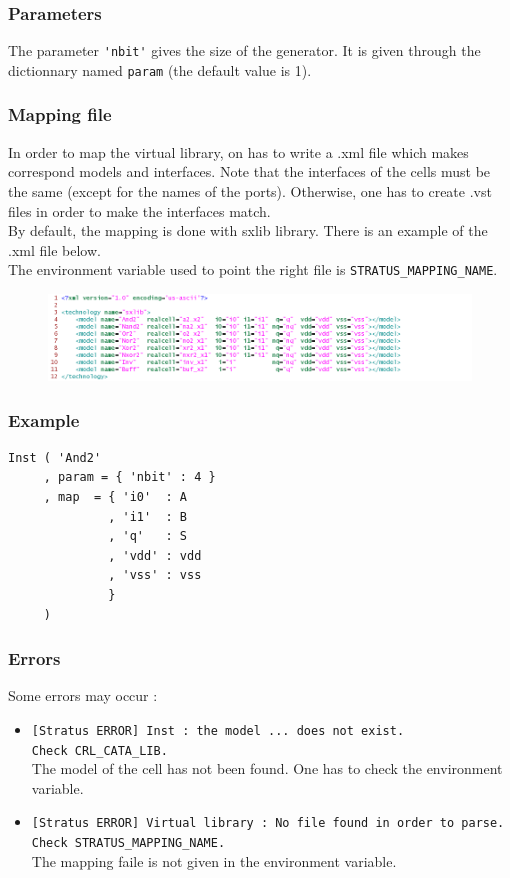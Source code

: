 \subsubsection{Parameters}

The parameter \verb-'nbit'- gives the size of the generator. It is given through the dictionnary named \verb-param- (the default value is 1).

\subsubsection{Mapping file}

In order to map the virtual library, on has to write a .xml file which makes correspond models and interfaces. Note that the interfaces of the cells must be the same (except for the names of the ports). Otherwise, one has to create .vst files in order to make the interfaces match.\\
\indent By default, the mapping is done with sxlib library. There is an example of the .xml file below.\\
\indent The environment variable used to point the right file is \verb-STRATUS_MAPPING_NAME-.
\begin{figure}[hbp]
\centering
\includegraphics[width=1.3\textwidth]{images/xml.png}
\end{figure}

\subsubsection{Example}

\begin{verbatim}
Inst ( 'And2'
     , param = { 'nbit' : 4 }
     , map  = { 'i0'  : A
              , 'i1'  : B
              , 'q'   : S
              , 'vdd' : vdd
              , 'vss' : vss
              }
     )
\end{verbatim}

\subsubsection{Errors}
    
Some errors may occur :
\begin{itemize}
    \item \verb-[Stratus ERROR] Inst : the model ... does not exist.-\\\verb-Check CRL_CATA_LIB.-\\The model of the cell has not been found. One has to check the environment variable.
    \item \verb-[Stratus ERROR] Virtual library : No file found in order to parse.-\\\verb-Check STRATUS_MAPPING_NAME.-\\The mapping faile is not given in the environment variable.
\end{itemize} 


